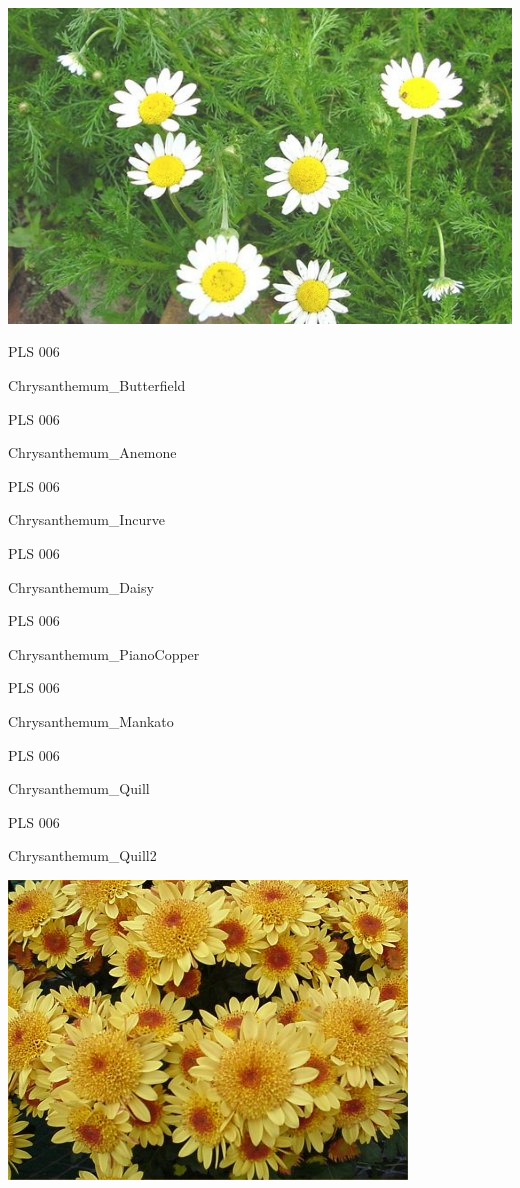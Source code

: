 \documentclass{article}
\begin{document}
\begin{center}
\includegraphics[height=0.925\paperheight]{../chamomile2.jpg}
\end{center}
\newpage

\noindent  PLS 006
\vfill
\centerline{{\huge Chrysanthemum\_Butterfield }}
\vfill
\newpage

\noindent  PLS 006
\vfill
\centerline{{\huge Chrysanthemum\_Anemone }}
\vfill
\newpage

\noindent  PLS 006
\vfill
\centerline{{\huge Chrysanthemum\_Incurve }}
\vfill
\newpage

\noindent  PLS 006
\vfill
\centerline{{\huge Chrysanthemum\_Daisy }}
\vfill
\newpage

\noindent  PLS 006
\vfill
\centerline{{\huge Chrysanthemum\_PianoCopper }}
\vfill
\newpage

\noindent  PLS 006
\vfill
\centerline{{\huge Chrysanthemum\_Mankato }}
\vfill
\newpage

\noindent  PLS 006
\vfill
\centerline{{\huge Chrysanthemum\_Quill }}
\vfill
\newpage

\noindent  PLS 006
\vfill
\centerline{{\huge Chrysanthemum\_Quill2 }}
\vfill
\newpage

\begin{center}
\includegraphics[height=0.925\paperheight]{../Chrysanthemum_Anemone.jpg}
\end{center}
\newpage
\end{document}
